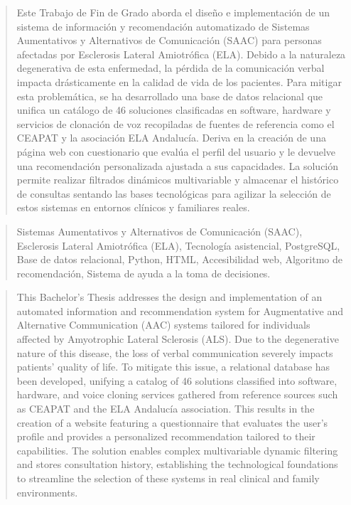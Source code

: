 \documentclass[a4paper,12pt,twoside]{memoir}
\begin{document}
\frontmatter
{}

\renewcommand*\abstractname{Resumen}
\begin{abstract}
Este Trabajo de Fin de Grado aborda el diseño e implementación de un sistema de información y recomendación automatizado de Sistemas Aumentativos y Alternativos de Comunicación (SAAC) para personas afectadas por Esclerosis Lateral Amiotrófica (ELA). Debido a la naturaleza degenerativa de esta enfermedad, la pérdida de la comunicación verbal impacta drásticamente en la calidad de vida de los pacientes. Para mitigar esta problemática, se ha desarrollado una base de datos relacional que unifica un catálogo de 46 soluciones clasificadas en software, hardware y servicios de clonación de voz recopiladas de fuentes de referencia como el CEAPAT y la asociación ELA Andalucía. Deriva en la creación de una página web con cuestionario que evalúa el perfil del usuario y le devuelve una recomendación personalizada ajustada a sus capacidades. La solución permite realizar filtrados dinámicos multivariable y almacenar el histórico de consultas sentando las bases tecnológicas para agilizar la selección de estos sistemas en entornos clínicos y familiares reales.
\end{abstract}

\renewcommand*\abstractname{Descriptores}
\begin{abstract}
Sistemas Aumentativos y Alternativos de Comunicación (SAAC), Esclerosis Lateral Amiotrófica (ELA), Tecnología asistencial, PostgreSQL, Base de datos relacional, Python, HTML, Accesibilidad web, Algoritmo de recomendación, Sistema de ayuda a la toma de decisiones.
\end{abstract}
\clearpage

\renewcommand*\abstractname{Abstract}
\begin{abstract}
This Bachelor's Thesis addresses the design and implementation of an automated information and recommendation system for Augmentative and Alternative Communication (AAC) systems tailored for individuals affected by Amyotrophic Lateral Sclerosis (ALS). Due to the degenerative nature of this disease, the loss of verbal communication severely impacts patients' quality of life. To mitigate this issue, a relational database has been developed, unifying a catalog of 46 solutions classified into software, hardware, and voice cloning services gathered from reference sources such as CEAPAT and the ELA Andalucía association. This results in the creation of a website featuring a questionnaire that evaluates the user's profile and provides a personalized recommendation tailored to their capabilities. The solution enables complex multivariable dynamic filtering and stores consultation history, establishing the technological foundations to streamline the selection of these systems in real clinical and family environments.
\end{abstract}
\end{document}
